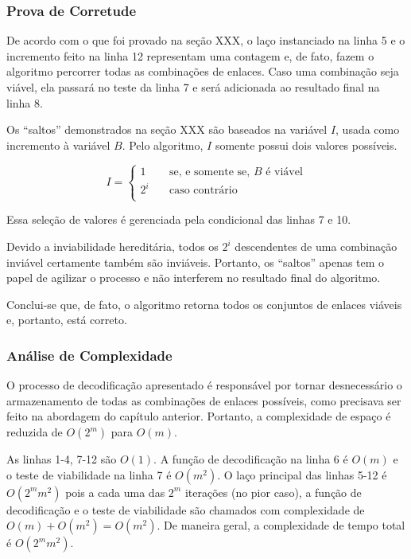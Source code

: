\subsubsection{Prova de Corretude}

De acordo com o que foi provado na seção XXX, o laço instanciado na linha 5 e o incremento feito na linha 12 representam uma contagem e, de fato, fazem o algoritmo percorrer todas as combinações de enlaces. Caso uma combinação seja viável, ela passará no teste da linha 7 e será adicionada ao resultado final na linha 8.

Os “saltos” demonstrados na seção XXX são baseados na variável $I$, usada como incremento à variável $B$. Pelo algoritmo, $I$ somente possui dois valores possíveis. 

\[ I =
\begin{cases}
	1	& \quad	\text{se, e somente se, } B \text{ é viável} \\
	2^i	& \quad	\text{caso contrário} \\
  \end{cases}
\]

Essa seleção de valores é gerenciada pela condicional das linhas 7 e 10.

Devido a inviabilidade hereditária, todos os $2^i$ descendentes de uma combinação inviável certamente também são inviáveis. Portanto, os “saltos” apenas tem o papel de agilizar o processo e não interferem no resultado final do algoritmo.

Conclui-se que, de fato, o algoritmo retorna todos os conjuntos de enlaces viáveis e, portanto, está correto.

\subsubsection{Análise de Complexidade}

O processo de decodificação apresentado é responsável por tornar desnecessário o armazenamento de todas as combinações de enlaces possíveis, como precisava ser feito na abordagem do capítulo anterior. Portanto, a complexidade de espaço é reduzida de $O(2^m)$ para $O(m)$.

	As linhas 1-4, 7-12 são $O(1)$. A função de decodificação na linha 6 é $O(m)$ e o teste de viabilidade na linha 7 é $O(m^2)$. O laço principal das linhas 5-12 é $O(2^mm^2)$ pois a cada uma das $2^m$ iterações (no pior caso), a função de decodificação e o teste de viabilidade são chamados com complexidade de $O(m) + O(m^2) = O(m^2)$. De maneira geral, a complexidade de tempo total é  $O(2^mm^2)$. 

